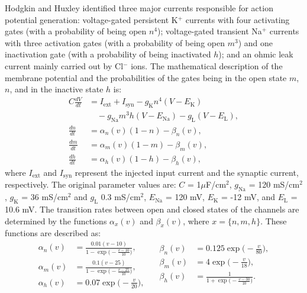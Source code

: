 \documentclass[../main.tex]{subfiles}
\begin{document}
Hodgkin and Huxley identified three major currents responsible for action potential generation: voltage-gated persistent K$^{+}$ currents with four activating gates (with a probability of being open $n^4$); voltage-gated transient Na$^{+}$ currents with three activation gates (with a probability of being open $m^3$) and one inactivation gate (with a probability of being inactivated $h$); and an ohmic leak current mainly carried out by Cl$^{-}$ ions.
The mathematical description of the membrane potential and the probabilities of the gates being in the open state $m$, $n$, and in the inactive state $h$ is:
\begin{equation}
\begin{aligned}
    C\displaystyle\frac{dV}{dt} &= I_{\text{ext}} + I_{\text{syn}} -
    g_\text{K}n^4(V-E_{\text{K}}) \\
    &\quad - g_{\text{Na}}m^3h(V-E_{\text{Na}}) - g_\text{L}(V-E_{\text{L}}),\\
        \displaystyle\frac{dn}{dt} &= \alpha_n(v)(1-n)-\beta_n(v),\\
        \displaystyle\frac{dm}{dt} &= \alpha_m(v)(1-m)-\beta_m(v),\\
        \displaystyle\frac{dh}{dt} &= \alpha_h(v)(1-h)-\beta_h(v),
    \label{eq:hodkin_huxley_eqs}
\end{aligned}
\end{equation}
where $I_\text{ext}$ and $I_\text{syn}$ represent the injected input current and the synaptic current, respectively.
The original parameter values are: $C$ = 1$\mu$F/cm$^2$, $g_{\text{Na}}$ = 120 mS/cm$^2$, $g_\text{K}$ = 36 mS/cm$^2$ and $g_\text{L}$ 0.3 mS/cm$^2$, $E_\text{Na}$ = 120 mV, $E_\text{K}$ = -12 mV, and $E_\text{L}$ = 10.6 mV.
The transition rates between open and closed states of the channels are determined by the functions $\alpha_x(v)$ and $\beta_x(v)$, where $x =\{n, m, h\}$.
These functions are described as:
\clearpage
\begin{equation}
   \begin{split}
        \alpha_n(v) &= \displaystyle\frac{0.01(v-10)}{1-\exp\big(-\frac{v-10}{10}\big)} ,\\
        \alpha_m(v) &= \displaystyle\frac{0.1(v-25)}{1-\exp\big(-\frac{v-25}{10}\big)}, \\
        \alpha_h(v) &= 0.07\exp\big(-\displaystyle\frac{v}{20}\big),\\
    \end{split}\quad
    \begin{split}
        \beta_n(v)  &= 0.125\exp\bigg(-\displaystyle\frac{v}{80}\bigg),\\
        \beta_m(v)  &= 4\exp\bigg(-\displaystyle\frac{v}{18}\bigg),\\
        \beta_h(v)  &= \displaystyle\frac{1}{1+\exp \big(-\frac{v-30}{10}\big)}.\\
    \end{split}
    \label{eq:gate_eqs}
\end{equation}
\end{document}
